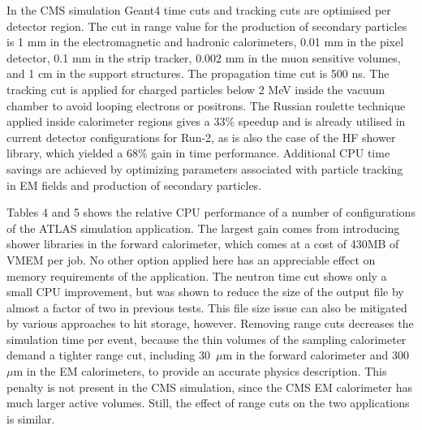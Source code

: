 \documentclass[12pt,a4paper]{article}
\begin{document}
{In the CMS simulation Geant4 time cuts and tracking
cuts are optimised per detector region. The cut in range value for the
production of secondary particles is 1 mm in the electromagnetic and
hadronic calorimeters, 0.01 mm in the pixel detector, 0.1 mm in the
strip tracker, 0.002 mm in the muon sensitive volumes, and 1 cm in the
support structures. The propagation time cut is 500 ns. The tracking cut
is applied for charged particles below 2 MeV inside the vacuum chamber
to avoid looping electrons or positrons. The Russian roulette technique
applied inside calorimeter regions gives a 33\% speedup and is already
utilised in current detector configurations for Run-2, as is also the
case of the HF shower library, which yielded a 68\% gain in time
performance. Additional CPU time savings are achieved by optimizing
parameters associated with particle tracking in EM fields and production
of secondary particles.

Tables 4 and 5 shows the relative CPU performance of a number of
configurations of the ATLAS simulation application. The largest gain
comes from introducing shower libraries in the forward calorimeter,
which comes at a cost of 430MB of VMEM per job. No other option applied
here has an appreciable effect on memory requirements of the
application. The neutron time cut shows only a small CPU improvement,
but was shown to reduce the size of the output file by almost a factor
of two in previous tests. This file size issue can also be mitigated by
various approaches to hit storage, however. Removing range cuts
decreases the simulation time per event, because the thin volumes of the
sampling calorimeter demand a tighter range cut, including 30~$\mu$m in the
forward calorimeter and 300~$\mu$m in the EM calorimeters, to provide an
accurate physics description. This penalty is not present in the CMS
simulation, since the CMS EM calorimeter has much larger active volumes.
Still, the effect of range cuts on the two applications is similar.

}
\end{document}
